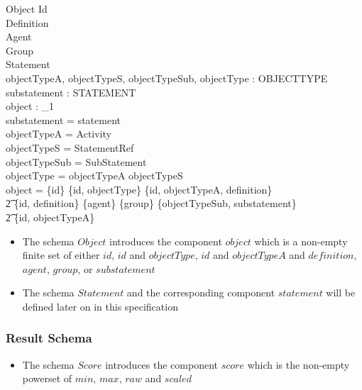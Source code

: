 \documentclass{article}
\begin{document}
  \begin{schema}{Object}
    Id \\
    Definition \\
    Agent \\
    Group \\
    Statement \\
    objectTypeA, objectTypeS, objectTypeSub, objectType  : OBJECTTYPE \\
    substatement : STATEMENT \\
    object : \finset_1 \\
    \where
    substatement = statement \\
    objectTypeA = Activity \\
    objectTypeS = StatementRef \\
    objectTypeSub = SubStatement \\
    objectType = objectTypeA \lor objectTypeS \\
    object = \{id\} \lor \{id, objectType\} \lor \{id, objectTypeA,
    definition\} \\ \t2 \lor \{id, definition\} \lor \{agent\} \lor
    \{group\} \lor \{objectTypeSub, substatement\} \\
    \t2 \lor \{id, objectTypeA\}
  \end{schema}
  \begin{itemize}
    \item The schema $Object$ introduces the component $object$ which
      is a non-empty finite set of either $id$, $id$ and $objectType$,
      $id$ and $objectTypeA$ and $definition$, $agent$, $group$, or
      $substatement$
    \item The schema $Statement$ and the corresponding component
      $statement$ will be defined later on in this specification
  \end{itemize}

  \subsubsection{Result Schema}

  \begin{itemize}
  \item The schema $Score$ introduces the component $score$ which is
    the non-empty powerset of $min$, $max$, $raw$ and $scaled$
  \end{itemize}
\end{document}
